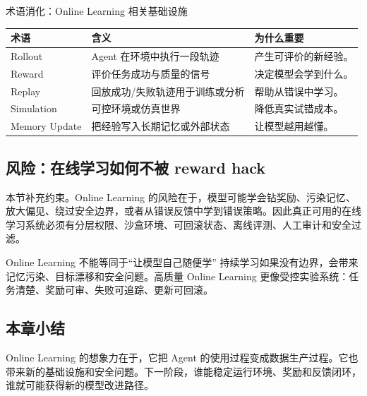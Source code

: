 \begin{knowledgebox}{术语消化：Online Learning 相关基础设施}
\noindent\begin{tabularx}{\textwidth}{p{}p{}X}
\toprule
术语 & 含义 & 为什么重要 \\
\midrule
Rollout & Agent 在环境中执行一段轨迹 & 产生可评价的新经验。 \\
Reward & 评价任务成功与质量的信号 & 决定模型会学到什么。 \\
Replay & 回放成功/失败轨迹用于训练或分析 & 帮助从错误中学习。 \\
Simulation & 可控环境或仿真世界 & 降低真实试错成本。 \\
Memory Update & 把经验写入长期记忆或外部状态 & 让模型越用越懂。 \\
\bottomrule
\end{tabularx}
\end{knowledgebox}

\subsection{风险：在线学习如何不被 reward hack}

本节补充约束。Online Learning 的风险在于，模型可能学会钻奖励、污染记忆、放大偏见、绕过安全边界，或者从错误反馈中学到错误策略。因此真正可用的在线学习系统必须有分层权限、沙盒环境、可回滚状态、离线评测、人工审计和安全过滤。

\begin{warningbox}{Online Learning 不能等同于“让模型自己随便学”}
持续学习如果没有边界，会带来记忆污染、目标漂移和安全问题。高质量 Online Learning 更像受控实验系统：任务清楚、奖励可审、失败可追踪、更新可回滚。
\end{warningbox}

\subsection{本章小结}

Online Learning 的想象力在于，它把 Agent 的使用过程变成数据生产过程。它也带来新的基础设施和安全问题。下一阶段，谁能稳定运行环境、奖励和反馈闭环，谁就可能获得新的模型改进路径。

